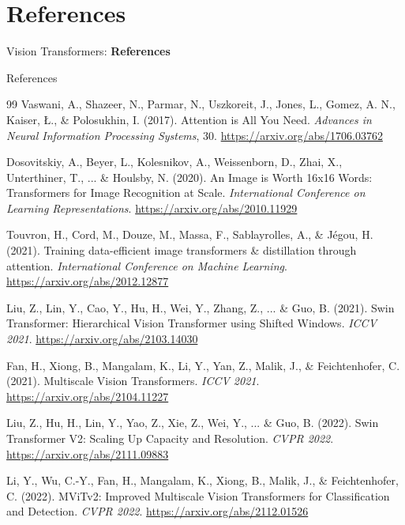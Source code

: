 \section{References}
\begin{frame}{}
    \LARGE Vision Transformers: \textbf{References}
\end{frame}

\begin{frame}[allowframebreaks]{References}
    \begin{thebibliography}{99}
        Vaswani, A., Shazeer, N., Parmar, N., Uszkoreit, J., Jones, L., Gomez, A. N., Kaiser, Ł., \& Polosukhin, I. (2017).
        Attention is All You Need.
        \emph{Advances in Neural Information Processing Systems}, 30.
        \url{https://arxiv.org/abs/1706.03762}

        Dosovitskiy, A., Beyer, L., Kolesnikov, A., Weissenborn, D., Zhai, X., Unterthiner, T., ... \& Houlsby, N. (2020).
        An Image is Worth 16x16 Words: Transformers for Image Recognition at Scale.
        \emph{International Conference on Learning Representations}.
        \url{https://arxiv.org/abs/2010.11929}

        Touvron, H., Cord, M., Douze, M., Massa, F., Sablayrolles, A., \& Jégou, H. (2021).
        Training data-efficient image transformers \& distillation through attention.
        \emph{International Conference on Machine Learning}.
        \url{https://arxiv.org/abs/2012.12877}

        Liu, Z., Lin, Y., Cao, Y., Hu, H., Wei, Y., Zhang, Z., ... \& Guo, B. (2021).
        Swin Transformer: Hierarchical Vision Transformer using Shifted Windows.
        \emph{ICCV 2021}.
        \url{https://arxiv.org/abs/2103.14030}

        Fan, H., Xiong, B., Mangalam, K., Li, Y., Yan, Z., Malik, J., \& Feichtenhofer, C. (2021).
        Multiscale Vision Transformers.
        \emph{ICCV 2021}.
        \url{https://arxiv.org/abs/2104.11227}

        Liu, Z., Hu, H., Lin, Y., Yao, Z., Xie, Z., Wei, Y., ... \& Guo, B. (2022).
        Swin Transformer V2: Scaling Up Capacity and Resolution.
        \emph{CVPR 2022}.
        \url{https://arxiv.org/abs/2111.09883}

        Li, Y., Wu, C.-Y., Fan, H., Mangalam, K., Xiong, B., Malik, J., \& Feichtenhofer, C. (2022).
        MViTv2: Improved Multiscale Vision Transformers for Classification and Detection.
        \emph{CVPR 2022}.
        \url{https://arxiv.org/abs/2112.01526}


\end{thebibliography}
\end{frame}
